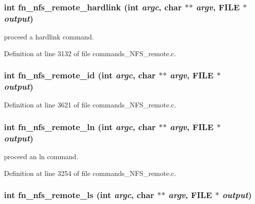 \subsubsection[{fn\_\-nfs\_\-remote\_\-hardlink}]{\setlength{\rightskip}{0pt plus 5cm}int fn\_\-nfs\_\-remote\_\-hardlink (int {\em argc}, \/  char $\ast$$\ast$ {\em argv}, \/  FILE $\ast$ {\em output})}\label{commands__NFS__remote_8c_d279971191c169cab4a91142e7346a68}


proceed a hardlink command. 

Definition at line 3132 of file commands\_\-NFS\_\-remote.c.
\subsubsection[{fn\_\-nfs\_\-remote\_\-id}]{\setlength{\rightskip}{0pt plus 5cm}int fn\_\-nfs\_\-remote\_\-id (int {\em argc}, \/  char $\ast$$\ast$ {\em argv}, \/  FILE $\ast$ {\em output})}\label{commands__NFS__remote_8c_dfe70596d1556c3acd01ba17fbe7bda8}




Definition at line 3621 of file commands\_\-NFS\_\-remote.c.
\subsubsection[{fn\_\-nfs\_\-remote\_\-ln}]{\setlength{\rightskip}{0pt plus 5cm}int fn\_\-nfs\_\-remote\_\-ln (int {\em argc}, \/  char $\ast$$\ast$ {\em argv}, \/  FILE $\ast$ {\em output})}\label{commands__NFS__remote_8c_e4a85d683c2bf488befc5192af4a2490}


proceed an ln command. 

Definition at line 3254 of file commands\_\-NFS\_\-remote.c.
\subsubsection[{fn\_\-nfs\_\-remote\_\-ls}]{\setlength{\rightskip}{0pt plus 5cm}int fn\_\-nfs\_\-remote\_\-ls (int {\em argc}, \/  char $\ast$$\ast$ {\em argv}, \/  FILE $\ast$ {\em output})}\label{commands__NFS__remote_8c_2f6620b40e586fff30ce7325049d29a7}


